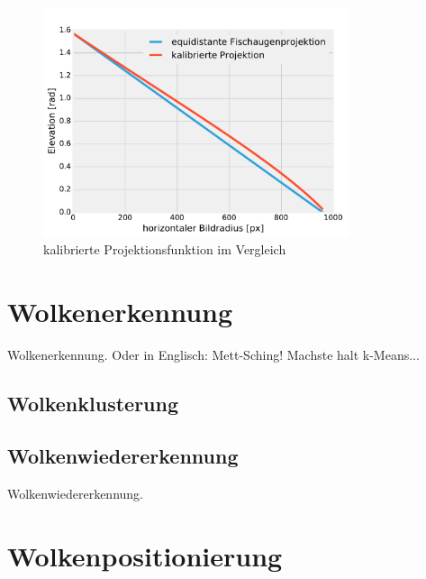 \documentclass[a4paper,11pt,twoside,german]{article}
\begin{document}
\begin{figure}
\begin{center}
\includegraphics[width=0.8\textwidth]{media/projection-calibration.pdf}
\caption[kalibrierte Projektionsfunktion]{kalibrierte Projektionsfunktion im
Vergleich} \end{center}
\end{figure}



\section{Wolkenerkennung}

Wolkenerkennung.
Oder in Englisch: Mett-Sching!
Machste halt k-Means...
\blindtext

\subsection{Wolkenklusterung}

\blindtext[3]



\subsection{Wolkenwiedererkennung}

Wolkenwiedererkennung.
\blindtext[3]




\section{Wolkenpositionierung}
\end{document}
